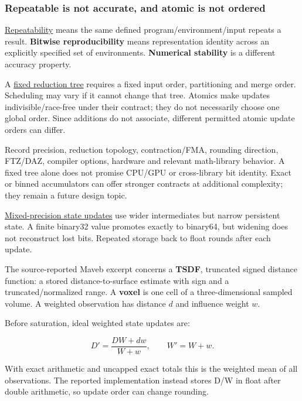\subsubsection{Repeatable is not accurate, and atomic is not ordered}\label{01-foundations-i-ch001-repeatable-is-not-accurate-and-atomic-is-not-ordered}

\hypertarget{01-foundations-i-ch001-repeatable-is-not-accurate-and-atomic-is-not-ordered}{}

\hyperref[appendix-5f1a2c3f97ff]{Repeatability} means the same defined program/environment/input repeats a result. \textbf{Bitwise reproducibility} means representation identity across an explicitly specified set of environments. \textbf{Numerical stability} is a different accuracy property.

A \hyperref[appendix-4c8e0238e7ee]{fixed reduction tree} requires a fixed input order, partitioning and merge order. Scheduling may vary if it cannot change that tree. Atomics make updates indivisible/race-free under their contract; they do not necessarily choose one global order. Since additions do not associate, different permitted atomic update orders can differ.

Record precision, reduction topology, contraction/FMA, rounding direction, FTZ/DAZ, compiler options, hardware and relevant math-library behavior. A fixed tree alone does not promise CPU/GPU or cross-library bit identity. Exact or binned accumulators can offer stronger contracts at additional complexity; they remain a future design topic.

\hyperref[appendix-260182e617b7]{Mixed-precision state updates} use wider intermediates but narrow persistent state. A finite binary32 value promotes exactly to binary64, but widening does not reconstruct lost bits. Repeated storage back to float rounds after each update.

The source-reported Maveb excerpt concerns a \textbf{TSDF}, truncated signed distance function: a stored distance-to-surface estimate with sign and a truncated/normalized range. A \textbf{voxel} is one cell of a three-dimensional sampled volume. A weighted observation has distance \(d\) and influence weight \(w\).

Before saturation, ideal weighted state updates are:

\[
D'=\frac{DW+dw}{W+w},\qquad W'=W+w.
\]

With exact arithmetic and uncapped exact totals this is the weighted mean of all observations. The reported implementation instead stores D/W in float after double arithmetic, so update order can change rounding.


